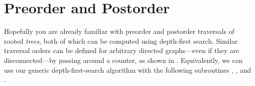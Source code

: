 \section{Preorder and Postorder}
\label{sec:6.1}

Hopefully you are already familiar with preorder and postorder traversals of rooted \textit{trees}, both of which can be computed using depth-first search.
Similar traversal orders can be defined for arbitrary directed graphs---even if they are disconnected---by passing around a counter, as shown in .
Equivalently, we can use our generic depth-first-search algorithm with the following subroutines , , and .

\begin{center}
\begin{minipage}[c]{0.3\linewidth}
\begin{pseudocode}
\\
\end{pseudocode}
\end{minipage}\hfill
\begin{minipage}[c]{0.33\linewidth}
\begin{pseudocode}
\\
\\
\end{pseudocode}
\end{minipage}\hfill
\begin{minipage}[c]{0.33\linewidth}
\begin{pseudocode}
\\
\\
\end{pseudocode}
\end{minipage}
\end{center}

